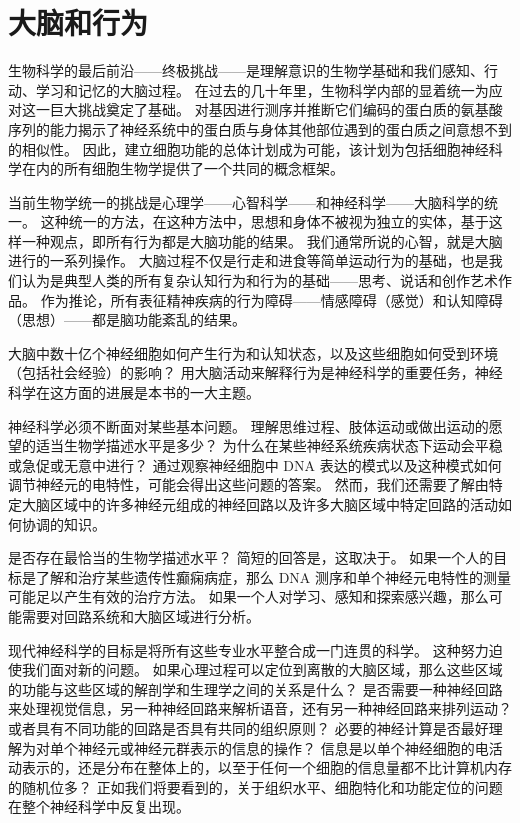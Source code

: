 \chapter{大脑和行为} \label{chap:chap1}
生物科学的最后前沿——终极挑战——是理解意识的生物学基础和我们感知、行动、学习和记忆的大脑过程。 
在过去的几十年里，生物科学内部的显着统一为应对这一巨大挑战奠定了基础。 
对基因进行测序并推断它们编码的蛋白质的氨基酸序列的能力揭示了神经系统中的蛋白质与身体其他部位遇到的蛋白质之间意想不到的相似性。 
因此，建立细胞功能的总体计划成为可能，该计划为包括细胞神经科学在内的所有细胞生物学提供了一个共同的概念框架。


当前生物学统一的挑战是心理学——心智科学——和神经科学——大脑科学的统一。 
这种统一的方法，在这种方法中，思想和身体不被视为独立的实体，基于这样一种观点，即所有行为都是大脑功能的结果。 
我们通常所说的心智，就是大脑进行的一系列操作。 
大脑过程不仅是行走和进食等简单运动行为的基础，也是我们认为是典型人类的所有复杂认知行为和行为的基础——思考、说话和创作艺术作品。 
作为推论，所有表征精神疾病的行为障碍——情感障碍（感觉）和认知障碍（思想）——都是脑功能紊乱的结果。


大脑中数十亿个神经细胞如何产生行为和认知状态，以及这些细胞如何受到环境（包括社会经验）的影响？ 
用大脑活动来解释行为是神经科学的重要任务，神经科学在这方面的进展是本书的一大主题。


神经科学必须不断面对某些基本问题。 
理解思维过程、肢体运动或做出运动的愿望的适当生物学描述水平是多少？ 
为什么在某些神经系统疾病状态下运动会平稳或急促或无意中进行？ 
通过观察神经细胞中 DNA 表达的模式以及这种模式如何调节神经元的电特性，可能会得出这些问题的答案。 
然而，我们还需要了解由特定大脑区域中的许多神经元组成的神经回路以及许多大脑区域中特定回路的活动如何协调的知识。


是否存在最恰当的生物学描述水平？ 
简短的回答是，这取决于。 
如果一个人的目标是了解和治疗某些遗传性癫痫病症，那么 DNA 测序和单个神经元电特性的测量可能足以产生有效的治疗方法。 
如果一个人对学习、感知和探索感兴趣，那么可能需要对回路系统和大脑区域进行分析。


现代神经科学的目标是将所有这些专业水平整合成一门连贯的科学。 
这种努力迫使我们面对新的问题。 如果心理过程可以定位到离散的大脑区域，那么这些区域的功能与这些区域的解剖学和生理学之间的关系是什么？ 
是否需要一种神经回路来处理视觉信息，另一种神经回路来解析语音，还有另一种神经回路来排列运动？ 
或者具有不同功能的回路是否具有共同的组织原则？ 
必要的神经计算是否最好理解为对单个神经元或神经元群表示的信息的操作？ 
信息是以单个神经细胞的电活动表示的，还是分布在整体上的，以至于任何一个细胞的信息量都不比计算机内存的随机位多？ 
正如我们将要看到的，关于组织水平、细胞特化和功能定位的问题在整个神经科学中反复出现。


